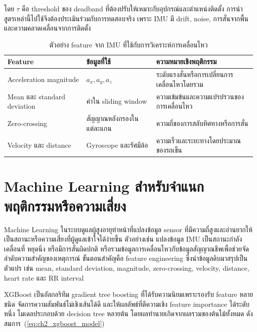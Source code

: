 โดย $\tau$ คือ threshold ของ deadband ที่ต้องปรับให้เหมาะกับอุปกรณ์และตำแหน่งติดตั้ง การนำสูตรเหล่านี้ไปใช้จึงต้องประเมินร่วมกับการทดสอบจริง เพราะ IMU มี drift, noise, การสั่นจากพื้น และความคลาดเคลื่อนจากการติดตั้ง

\begin{table}[htbp]
    \centering
    \caption{ตัวอย่าง feature จาก IMU ที่ใช้กับการวิเคราะห์การเคลื่อนไหว}
    \label{tab:ch2_imu_features}
    \small
    \begin{tabular}{>{\raggedright\arraybackslash}p{}
                    >{\raggedright\arraybackslash}p{}
                    >{\raggedright\arraybackslash}p{}}
        \toprule
        Feature & ข้อมูลที่ใช้ & ความหมายเชิงพฤติกรรม \\ \midrule
        Acceleration magnitude & $a_x,a_y,a_z$ & ระดับแรงสั่นหรือการเปลี่ยนการเคลื่อนไหวโดยรวม \\ \midrule
        Mean และ standard deviation & ค่าใน sliding window & ความเข้มข้นและความแปรปรวนของการเคลื่อนไหว \\ \midrule
        Zero-crossing & สัญญาณหลังกรองในแต่ละแกน & ความถี่ของการสลับทิศทางหรือการสั่น \\ \midrule
        Velocity และ distance & Gyroscope และรัศมีล้อ & ความเร็วและระยะทางโดยประมาณของรถเข็น \\ \bottomrule
    \end{tabular}
\end{table}

\section{Machine Learning สำหรับจำแนกพฤติกรรมหรือความเสี่ยง}
\label{sec:ch2_ml_behavior}

Machine Learning ในระบบดูแลผู้สูงอายุทำหน้าที่แปลงข้อมูล sensor ที่มีความถี่สูงและอ่านยากให้เป็นสถานะหรือความเสี่ยงที่ผู้ดูแลเข้าใจได้ง่ายขึ้น ตัวอย่างเช่น แปลงข้อมูล IMU เป็นสถานะกำลังเคลื่อนที่ หยุดนิ่ง หรือมีการสั่นผิดปกติ หรือรวมข้อมูลการเคลื่อนไหวกับข้อมูลสัญญาณชีพเพื่อช่วยจัดลำดับความสำคัญของเหตุการณ์ ขั้นตอนสำคัญคือ feature engineering ซึ่งนำข้อมูลดิบมาสรุปเป็นตัวแปร เช่น mean, standard deviation, magnitude, zero-crossing, velocity, distance, heart rate และ RR interval

XGBoost เป็นอัลกอริทึม gradient tree boosting ที่ได้รับความนิยมเพราะรองรับ feature หลายชนิด จัดการความสัมพันธ์ไม่เชิงเส้นได้ดี และให้ผลลัพธ์ที่ตีความเชิง feature importance ได้ระดับหนึ่ง โมเดลประกอบด้วย decision tree หลายต้น โดยผลทำนายเกิดจากผลรวมของต้นไม้ทั้งหมด ดังสมการ~(\ref{eq:ch2_xgboost_model}) \cite{Chen2016XGBoost}

